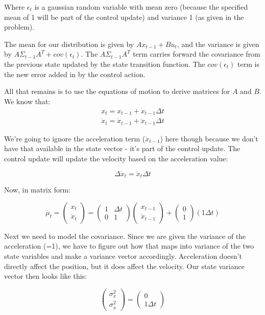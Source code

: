 \documentclass[10pt]{article}
\begin{document}
\begin{enumerate}
\begin{enumerate}
  Where $\epsilon_t$ is a gaussian random variable with mean zero (because the
  specified mean of 1 will be part of the control update) and variance 1 (as
  given in the problem).
 
  The mean for our distribution is given by $A x_{t-1} + B u_t$, and the
  variance is given by $A\Sigma_{t-1}A^T + cov(\epsilon_t)$. The
  $A\Sigma_{t-1}A^T$ term carries forward the covariance from the previous state
  updated by the state transition function. The $cov(\epsilon_t)$ term is the
  new error added in by the control action.

  All that remains is to use the equations of motion to derive matrices for $A$
  and $B$. We know that:
  \begin{gather}
  x_t = x_{t-1} + \dot{x}_{t-1} \Delta t \\ 
  \dot{x}_t = \dot{x}_{t-1} + \ddot{x}_{t-1} \Delta t
  \end{gather}

  We're going to ignore the acceleration term ($\ddot{x}_{t-1}$) here though
  because we don't have that available in the state vector - it's part of the
  control update. The control update will update the velocity based on the
  acceleration value:

  $$\Delta\dot{x}_t = \ddot{x}_t\Delta t$$

  Now, in matrix form:

  $$
\overline{\mu}_t = \begin{pmatrix}x_t \\ \dot{x}_t\end{pmatrix} = 
\begin{pmatrix}1 & \Delta t \\ 0 & 1\end{pmatrix} \begin{pmatrix}x_{t-1} \\
\dot{x}_{t-1} \end{pmatrix}+
\begin{pmatrix}0 \\ 1\end{pmatrix} (1 \Delta t)
  $$

  Next we need to model the covariance. Since we are given the variance of the
  acceleration (=1), we have to figure out how that maps into variance of the
  two state variables and make a variance vector accordingly. Acceleration
  doesn't directly affect the position, but it does affect the velocity. Our
  state variance vector then looks like this:

  $$
\begin{pmatrix}\sigma_x^2 \\ \sigma_{\dot{x}}^2\end{pmatrix} = 
\begin{pmatrix}0 \\ 1\Delta t\end{pmatrix}
  $$


\end{enumerate}
\end{enumerate}
\end{document}
